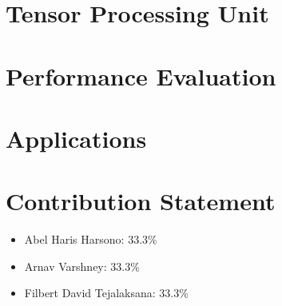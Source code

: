 \documentclass[conference]{IEEEtran}
\begin{document}
    \section{Tensor Processing Unit}
    \label{sec:tensor-processing-unit}
    


    \section{Performance Evaluation}
    \label{sec:performance-evaluation}
    

    \vspace{15pt}


    \section{Applications}
    \label{sec:Applications}
    

    \vspace{15pt}


    \section{Contribution Statement}
    \label{sec:contribution-statement}
    \begin{itemize}
        \item Abel Haris Harsono: 33.3\%
        \item Arnav Varshney: 33.3\%
        \item Filbert David Tejalaksana: 33.3\%
    \end{itemize}

    \vspace{15pt}
    \label{itm:refs}
    
\end{document}
